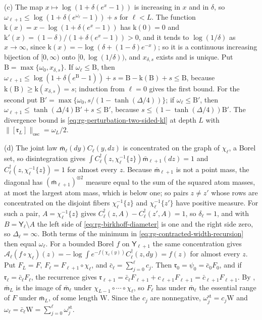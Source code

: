 (c) The map $x\mapsto\log(1+\delta(e^x-1))$ is increasing in $x$ and in $\delta$,
so $\omega_{\ell+1}\le\log(1+\delta(e^{\omega_\ell}-1))+s$ for $\ell<L$. The
function $\mathrm k(x)=x-\log(1+\delta(e^x-1))$ has $\mathrm k(0)=0$ and
$\mathrm k'(x)=(1-\delta)/(1+\delta(e^x-1))>0$, and it tends to $\log(1/\delta)$ as
$x\to\infty$, since $\mathrm k(x)=-\log(\delta+(1-\delta)e^{-x})$; so it is a
continuous increasing bijection of $[0,\infty)$ onto $[0,\log(1/\delta))$, and
$x_{\delta,s}$ exists and is unique. Put $\mathrm B=\max\{\omega_0,x_{\delta,s}\}$.
If $\omega_\ell\le\mathrm B$, then
$\omega_{\ell+1}\le\log(1+\delta(e^{\mathrm B}-1))+s=\mathrm B-\mathrm k(\mathrm B)+s\le\mathrm B$,
because $\mathrm k(\mathrm B)\ge\mathrm k(x_{\delta,s})=s$; induction from $\ell=0$
gives the first bound. For the second put
$\mathrm B'=\max\{\omega_0,s/(1-\tanh(\Delta/4))\}$; if $\omega_\ell\le\mathrm B'$,
then $\omega_{\ell+1}\le\tanh(\Delta/4)\mathrm B'+s\le\mathrm B'$, because
$s\le(1-\tanh(\Delta/4))\mathrm B'$. The divergence bound is
\eqref{eq:rg-perturbation-two-sided-kl} at depth $L$ with
$\lVert[\mathfrak r_L]\rVert_{\mathrm{osc}}=\omega_L/2$.

(d) The joint law $\bar{\mathsf m}_\ell(dy)C_\ell(y,dz)$ is concentrated on the graph
of $\chi_\ell$, a Borel set, so disintegration gives
$\int C^\dagger_\ell(z,\chi_\ell^{-1}\{z\})\bar{\mathsf m}_{\ell+1}(dz)=1$ and
$C^\dagger_\ell(z,\chi_\ell^{-1}\{z\})=1$ for almost every $z$. Because
$\bar{\mathsf m}_{\ell+1}$ is not a point mass, the diagonal has
$(\bar{\mathsf m}_{\ell+1})^{\otimes2}$ measure equal to the sum of the squared atom
masses, at most the largest atom mass, which is below one; so pairs $z\ne z'$ whose
rows are concentrated on the disjoint fibers $\chi_\ell^{-1}\{z\}$ and
$\chi_\ell^{-1}\{z'\}$ have positive measure. For such a pair, $A=\chi_\ell^{-1}\{z\}$
gives $C^\dagger_\ell(z,A)-C^\dagger_\ell(z',A)=1$, so $\delta_\ell=1$, and with
$B=\mathsf Y_\ell\setminus A$ the left side of \eqref{eq:rg-birkhoff-diameter} is one
and the right side zero, so $\Delta_\ell=\infty$. Both terms of the minimum in
\eqref{eq:rg-contracted-width-recursion} then equal $\omega_\ell$. For a bounded
Borel $f$ on $\mathsf Y_{\ell+1}$ the same concentration gives
$\mathcal A_\ell(f\circ\chi_\ell)(z)=-\log\int e^{-f(\chi_\ell(y))}C^\dagger_\ell(z,dy)=f(z)$
for almost every $z$. Put $F_L=F$, $F_\ell=F_{\ell+1}\circ\chi_\ell$, and
$\bar c_\ell=\sum_{j=0}^{\ell}c_j$. Then $\mathfrak r_0=\psi_0=\bar c_0F_0$, and
if $\mathfrak r_\ell=\bar c_\ell F_\ell$, the recurrence gives
$\mathfrak r_{\ell+1}=\bar c_\ell F_{\ell+1}+c_{\ell+1}F_{\ell+1}=\bar c_{\ell+1}F_{\ell+1}$.
By , $\bar{\mathsf m}_L$ is the image of
$\bar{\mathsf m}_\ell$ under $\chi_{L-1}\circ\cdots\circ\chi_\ell$, so $F_\ell$ has
under $\bar{\mathsf m}_\ell$ the essential range of $F$ under $\bar{\mathsf m}_L$,
of some length $\mathrm W$. Since the $c_j$ are nonnegative,
$\omega^{\mathrm{st}}_j=c_j\mathrm W$ and
$\omega_\ell=\bar c_\ell\mathrm W=\sum_{j=0}^{\ell}\omega^{\mathrm{st}}_j$.

